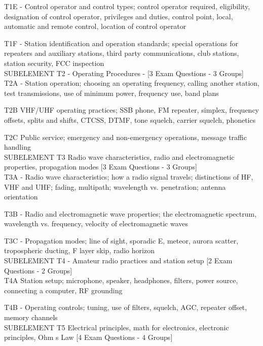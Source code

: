 \documentclass[12pt,letterpaper]{report}
\begin{document}
T1E - Control operator and control types; control operator required, eligibility, designation of control operator, privileges and duties, control point, local, automatic and remote control, location of control operator 

T1F - Station identification and operation standards; special operations for repeaters and auxiliary stations, third party communications, club stations, station security, FCC inspection\\


SUBELEMENT T2 - Operating Procedures - [3 Exam Questions - 3 Groups]\\

T2A - Station operation; choosing an operating frequency, calling another station, test transmissions, use of minimum power, frequency use, band plans

T2B   VHF/UHF operating practices; SSB phone, FM repeater, simplex, frequency offsets, splits and shifts, CTCSS, DTMF, tone squelch, carrier squelch, phonetics

T2C  Public service; emergency and non-emergency operations, message traffic handling\\


SUBELEMENT T3   Radio wave characteristics, radio and electromagnetic properties, propagation modes   [3 Exam Questions - 3 Groups]\\

T3A - Radio wave characteristics; how a radio signal travels; distinctions of HF, VHF and UHF; fading, multipath; wavelength vs. penetration; antenna orientation

T3B - Radio and electromagnetic wave properties; the electromagnetic spectrum, wavelength vs. frequency, velocity of electromagnetic waves 

T3C - Propagation modes; line of sight, sporadic E, meteor, aurora scatter, tropospheric ducting, F layer skip, radio horizon\\


SUBELEMENT T4 - Amateur radio practices and station setup   [2 Exam Questions - 2 Groups]\\

T4A   Station setup; microphone, speaker, headphones, filters, power source, connecting a computer, RF grounding

T4B - Operating controls; tuning, use of filters, squelch, AGC, repeater offset, memory channels\\


SUBELEMENT T5   Electrical principles, math for electronics, electronic principles, Ohm s Law   [4 Exam Questions - 4 Groups]\\
\end{document}
